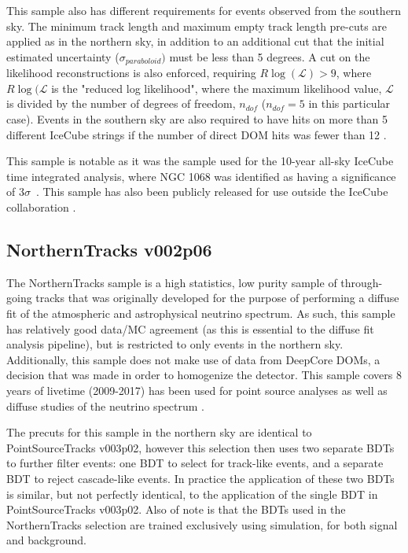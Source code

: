 This sample also has different requirements for events observed from the southern sky. The minimum track length and maximum empty track length pre-cuts are applied as in the northern sky, in addition to an additional cut that the initial estimated uncertainty ($\sigma_{paraboloid})$ must be less than 5 degrees. A cut on the likelihood reconstructions is also enforced, requiring $R\log(\mathcal{L}) > 9$, where $R\log(\mathcal{L}$ is the "reduced log likelihood", where the maximum likelihood value, $\mathcal{L}$ is divided by the number of degrees of freedom, $n_{dof}$ ($n_{dof} = 5$ in this particular case). Events in the southern sky are also required to have hits on more than 5 different IceCube strings if the number of direct DOM hits was fewer than 12 \cite{TessaThesis}. 

This sample is notable as it was the sample used for the 10-year all-sky IceCube time integrated analysis, where NGC 1068 was identified as having a significance of $3 \sigma$~\cite{10yr_tint}. This sample has also been publicly released for use outside the IceCube collaboration \cite{10yrpublicdata}.

\subsection{NorthernTracks v002p06}
The NorthernTracks sample is a high statistics, low purity sample of through-going tracks that was originally developed for the purpose of performing a diffuse fit of the atmospheric and astrophysical neutrino spectrum. As such, this sample has relatively good data/MC agreement (as this is essential to the diffuse fit analysis pipeline), but is restricted to only events in the northern sky. Additionally, this sample does not make use of data from DeepCore DOMs,  a decision that was made in order to homogenize the detector. This sample covers 8 years of livetime (2009-2017) has been used for point source analyses as well as diffuse studies of the neutrino spectrum \cite{NorthernTracks_PS}. 

The precuts for this sample in the northern sky are identical to PointSourceTracks v003p02, however this selection then uses two separate BDTs to further filter events: one BDT to select for track-like events, and a separate BDT to reject cascade-like events. In practice the application of these two BDTs is similar, but not perfectly identical, to the application of the single BDT in PointSourceTracks v003p02. Also of note is that the BDTs used in the NorthernTracks selection are trained exclusively using simulation, for both signal and background.

